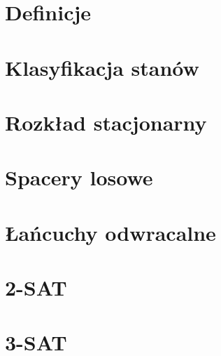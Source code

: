 \section{Definicje}


\newpage
\section{Klasyfikacja stanów}


\newpage
\section{Rozkład stacjonarny}


\newpage
\section{Spacery losowe}


\newpage
\section{Łańcuchy odwracalne}


\newpage
\section{2-SAT}


\newpage
\section{3-SAT}


